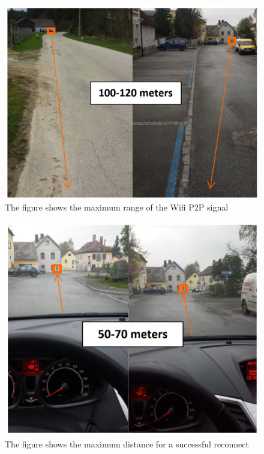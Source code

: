 \begin{figure}[hb]
	\centering
  \includegraphics[width=\linewidth]{images/androidScreen4.eps}
	\caption{The figure shows the maximum range of the Wifi P2P signal}
	\label{fig1}
\end{figure}

\begin{figure}[H]
	\centering
  \includegraphics[width=\linewidth]{images/androidScreen5.eps}
	\caption{The figure shows the maximum distance for a successful reconnect}
	\label{fig1}
\end{figure}

